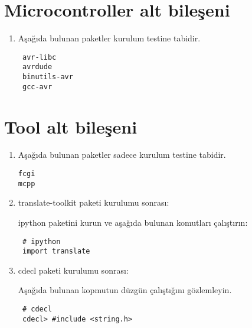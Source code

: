 \documentclass[a4paper,10pt]{article}
\begin{document}
\section{Microcontroller alt bileşeni}
\begin{enumerate}
 \item Aşağıda bulunan paketler kurulum testine tabidir.
\begin{verbatim}
 avr-libc
 avrdude
 binutils-avr
 gcc-avr
\end{verbatim}

\end{enumerate}

\section{Tool alt bileşeni}
\begin{enumerate}
 \item Aşağıda bulunan paketler sadece kurulum testine tabidir.
\begin{verbatim}
fcgi
mcpp
\end{verbatim}
\item translate-toolkit paketi kurulumu sonrası:

ipython paketini kurun ve aşağıda bulunan komutları çalıştırın:
\begin{verbatim}
 # ipython
 import translate
\end{verbatim}

\item cdecl paketi kurulumu sonrası:

Aşağıda bulunan kopmutun düzgün çalıştığını gözlemleyin.
\begin{verbatim}
 # cdecl
 cdecl> #include <string.h>
\end{verbatim}

\end{enumerate}
\end{document}
